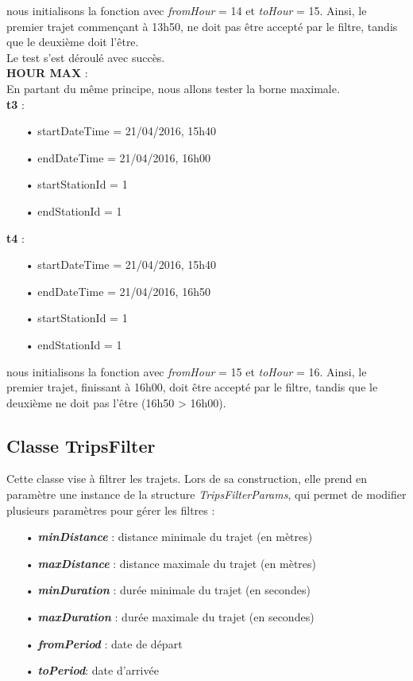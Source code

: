 \documentclass[12pt]{article}
\begin{document}
	nous initialisons la fonction avec \textit{fromHour} = 14 et \textit{toHour} = 15. Ainsi, le premier trajet commençant à 13h50, ne doit pas être accepté par le filtre, tandis que le deuxième doit l’être.\\

	Le test s’est déroulé avec succès.\\
	
	\textbf{HOUR MAX} :\\
	En partant du même principe, nous allons tester la borne maximale.\\

	\textbf{t3} :
	\begin{itemize}
	\item[•] startDateTime = 21/04/2016, 15h40
	\item[•] endDateTime = 21/04/2016, 16h00
	\item[•] startStationId = 1
	\item[•] endStationId = 1 \\
	\end{itemize}
	
	
	\textbf{t4} :	
	\begin{itemize}
	\item[•] startDateTime = 21/04/2016, 15h40
	\item[•] endDateTime = 21/04/2016, 16h50
	\item[•] startStationId = 1
	\item[•] endStationId = 1 \\
	\end{itemize}
	
	nous initialisons la fonction avec \textit{fromHour} = 15 et \textit{toHour} = 16. Ainsi, le premier trajet, finissant à 16h00, doit être accepté par le filtre, tandis que le deuxième ne doit pas l’être (16h50 > 16h00).\\

	\subsection{Classe TripsFilter}
	Cette classe vise à filtrer les trajets. Lors de sa construction, elle prend en paramètre une instance de la structure \textit{TripsFilterParams}, qui permet de modifier plusieurs paramètres pour gérer les filtres :\\
	\begin{itemize}
	\item[•] \textbf{\textit{minDistance}} : distance minimale du trajet (en mètres)
	\item[•] \textbf{\textit{maxDistance}} : distance maximale du trajet (en mètres)
	\item[•] \textbf{\textit{minDuration}} : durée minimale du trajet (en secondes)
	\item[•] \textbf{\textit{maxDuration}} : durée maximale du trajet (en secondes)
	\item[•] \textbf{\textit{fromPeriod}} : date de départ
	\item[•] \textbf{\textit{toPeriod}}: date d’arrivée	
	\end{itemize}
		
\end{document}
